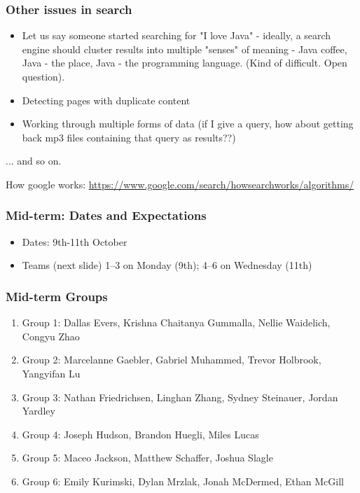 \documentclass{beamer}
\begin{document}
\begin{frame}
\frametitle{Other issues in search}
\begin{itemize}
\item Let us say someone started searching for "I love Java" - ideally, a search engine should cluster results into multiple "senses" of meaning - Java coffee, Java - the place, Java - the programming language. (Kind of difficult. Open question). \pause
\item Detecting pages with duplicate content \pause 
\item Working through multiple forms of data (if I give a query, how about getting back mp3 files containing that query as results??) 
\end{itemize}
... and so on.
\end{frame}

\begin{frame}
How google works:  \url{https://www.google.com/search/howsearchworks/algorithms/}
\end{frame}

\begin{frame}
\frametitle{Mid-term: Dates and Expectations}
\begin{itemize}
\item Dates: 9th-11th October
\item Teams (next slide) 1--3 on Monday (9th); 4--6 on Wednesday (11th) 
\end{itemize}
\end{frame}

\begin{frame}
\frametitle{Mid-term Groups}
\begin{enumerate}
\item Group 1: Dallas Evers, Krishna Chaitanya Gummalla, Nellie Waidelich, Congyu Zhao
\item Group 2: Marcelanne Gaebler, Gabriel Muhammed, Trevor Holbrook, Yangyifan Lu
\item Group 3: Nathan Friedrichsen, Linghan Zhang, Sydney Steinauer, Jordan Yardley
\item Group 4: Joseph Hudson, Brandon Huegli, Miles Lucas
\item Group 5: Maceo Jackson, Matthew Schaffer, Joshua Slagle
\item Group 6: Emily Kurimski, Dylan Mrzlak, Jonah McDermed, Ethan McGill
\end{enumerate}
\end{frame}
\end{document}
